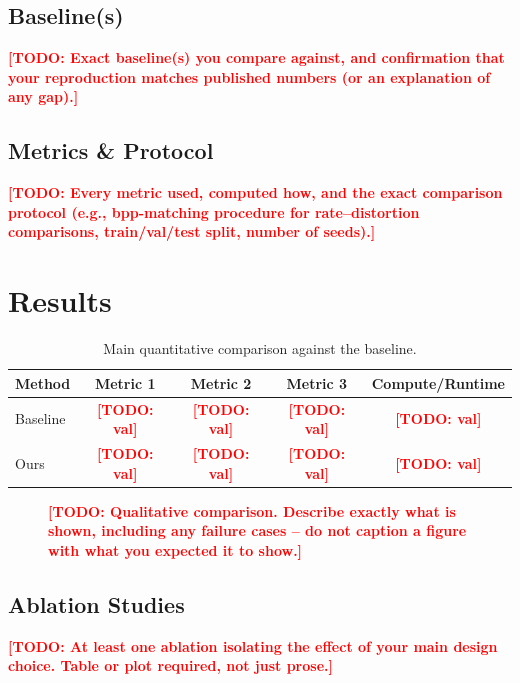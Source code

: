 \documentclass[11pt]{article}
\newcommand{\todo}[1]{\textcolor{red}{\textbf{[TODO: #1]}}}
\begin{document}
\subsection{Baseline(s)}
\todo{Exact baseline(s) you compare against, and confirmation that your reproduction
matches published numbers (or an explanation of any gap).}

\subsection{Metrics \& Protocol}
\todo{Every metric used, computed how, and the exact comparison protocol (e.g.,
bpp-matching procedure for rate--distortion comparisons, train/val/test split, number
of seeds).}

\section{Results}
\label{sec:results}

\begin{table}[h]
\centering
\caption{Main quantitative comparison against the baseline.}
\label{tab:main}
\begin{tabular}{@{}lcccc@{}}
\toprule
\textbf{Method} & \textbf{Metric 1} & \textbf{Metric 2} & \textbf{Metric 3} & \textbf{Compute/Runtime} \\
\midrule
Baseline      & \todo{val} & \todo{val} & \todo{val} & \todo{val} \\
Ours          & \todo{val} & \todo{val} & \todo{val} & \todo{val} \\
\bottomrule
\end{tabular}
\end{table}

\begin{figure}[h]
\centering
\caption{\todo{Qualitative comparison. Describe exactly what is shown, including any
failure cases -- do not caption a figure with what you expected it to show.}}
\label{fig:qual}
\end{figure}

\subsection{Ablation Studies}
\label{sec:ablation}
\todo{At least one ablation isolating the effect of your main design choice. Table or
plot required, not just prose.}
\end{document}
